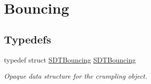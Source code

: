 \hypertarget{group__bouncing}{}\section{Bouncing}
\label{group__bouncing}
\subsection*{Typedefs}
\begin{DoxyCompactItemize}
\item 
\hypertarget{group__bouncing_gaab51e1dac97a045a7e339645c7ef84e8}{}typedef struct \hyperlink{group__bouncing_gaab51e1dac97a045a7e339645c7ef84e8}{S\+D\+T\+Bouncing} \hyperlink{group__bouncing_gaab51e1dac97a045a7e339645c7ef84e8}{S\+D\+T\+Bouncing}\label{group__bouncing_gaab51e1dac97a045a7e339645c7ef84e8}

\begin{DoxyCompactList}\small\item\em Opaque data structure for the crumpling object. \end{DoxyCompactList}\end{DoxyCompactItemize}
